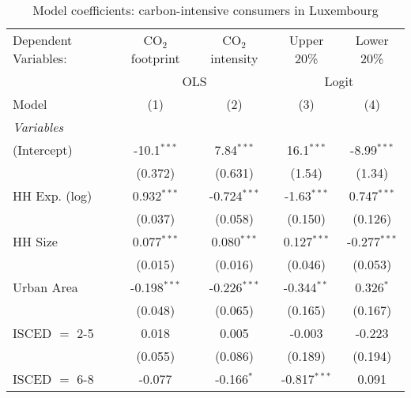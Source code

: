 
\begin{table}[htbp!]
   \centering
   \small
   \begin{adjustbox}{width = 1\textwidth, max height = 0.95\textheight, center}
      \begin{threeparttable}[b]
         \caption{\label{tab:Logit_1_LUX} Model coefficients: carbon-intensive consumers in Luxembourg}
         \begin{tabular}{lcccc}
            \tabularnewline \midrule \midrule
            Dependent Variables: & CO$_{2}$ footprint & CO$_{2}$ intensity & Upper 20\%     & Lower 20\%\\   
             & \multicolumn{2}{c}{OLS} & \multicolumn{2}{c}{Logit} \\ 
            Model                & (1)                & (2)                & (3)            & (4)\\  
            \midrule
            \emph{Variables}\\
            (Intercept)          & -10.1$^{***}$      & 7.84$^{***}$       & 16.1$^{***}$   & -8.99$^{***}$\\   
                                 & (0.372)            & (0.631)            & (1.54)         & (1.34)\\   
            HH Exp. (log)        & 0.932$^{***}$      & -0.724$^{***}$     & -1.63$^{***}$  & 0.747$^{***}$\\   
                                 & (0.037)            & (0.058)            & (0.150)        & (0.126)\\   
            HH Size              & 0.077$^{***}$      & 0.080$^{***}$      & 0.127$^{***}$  & -0.277$^{***}$\\   
                                 & (0.015)            & (0.016)            & (0.046)        & (0.053)\\   
            Urban Area           & -0.198$^{***}$     & -0.226$^{***}$     & -0.344$^{**}$  & 0.326$^{*}$\\   
                                 & (0.048)            & (0.065)            & (0.165)        & (0.167)\\   
            ISCED $=$ 2-5        & 0.018              & 0.005              & -0.003         & -0.223\\   
                                 & (0.055)            & (0.086)            & (0.189)        & (0.194)\\   
            ISCED $=$ 6-8        & -0.077             & -0.166$^{*}$       & -0.817$^{***}$ & 0.091\\   

\end{tabular}
\end{threeparttable}
\end{adjustbox}
\end{table}
